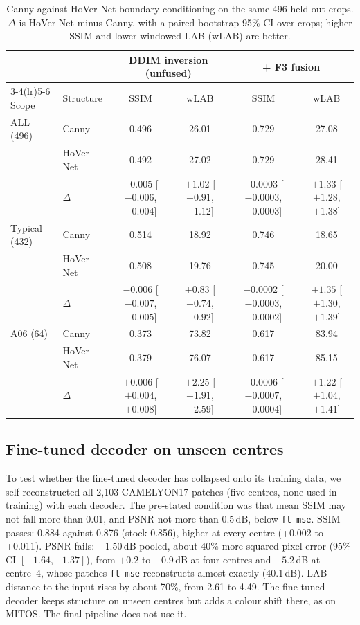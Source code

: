 \begin{table}[!tbp]
\centering
\caption{Canny against HoVer-Net boundary conditioning on the same 496 held-out crops. $\Delta$ is HoVer-Net
minus Canny, with a paired bootstrap 95\% CI over crops; higher SSIM and lower windowed LAB (wLAB) are better.}
\label{tab:app-hovernet}
\footnotesize
\begin{tabular}{llcccc}
\toprule
& & \multicolumn{2}{c}{DDIM inversion (unfused)} & \multicolumn{2}{c}{+ F3 fusion}\\
\cmidrule(lr){3-4}\cmidrule(lr){5-6}
Scope & Structure & SSIM & wLAB & SSIM & wLAB\\
\midrule
ALL (496) & Canny & 0.496 & 26.01 & 0.729 & 27.08\\
 & HoVer-Net & 0.492 & 27.02 & 0.729 & 28.41\\
 & $\Delta$ & $-0.005$ [$-0.006$, $-0.004$] & $+1.02$ [$+0.91$, $+1.12$] & $-0.0003$ [$-0.0003$, $-0.0003$] & $+1.33$ [$+1.28$, $+1.38$]\\
\midrule
Typical (432) & Canny & 0.514 & 18.92 & 0.746 & 18.65\\
 & HoVer-Net & 0.508 & 19.76 & 0.745 & 20.00\\
 & $\Delta$ & $-0.006$ [$-0.007$, $-0.005$] & $+0.83$ [$+0.74$, $+0.92$] & $-0.0002$ [$-0.0003$, $-0.0002$] & $+1.35$ [$+1.30$, $+1.39$]\\
\midrule
A06 (64) & Canny & 0.373 & 73.82 & 0.617 & 83.94\\
 & HoVer-Net & 0.379 & 76.07 & 0.617 & 85.15\\
 & $\Delta$ & $+0.006$ [$+0.004$, $+0.008$] & $+2.25$ [$+1.91$, $+2.59$] & $-0.0006$ [$-0.0007$, $-0.0004$] & $+1.22$ [$+1.04$, $+1.41$]\\
\bottomrule
\end{tabular}
\end{table}

\subsection{Fine-tuned decoder on unseen centres}
\label{app:decoder-cam}
To test whether the fine-tuned decoder has collapsed onto its training data, we self-reconstructed all 2{,}103
CAMELYON17 patches (five centres, none used in training) with each decoder. The pre-stated condition was that mean
SSIM may not fall more than 0.01, and PSNR not more than 0.5\,dB, below \texttt{ft-mse}. SSIM passes: 0.884 against
0.876 (stock 0.856), higher at every centre (+0.002 to +0.011). PSNR fails: $-1.50$\,dB pooled, about 40\% more squared pixel error (95\% CI $[-1.64,
-1.37]$), from $+0.2$ to $-0.9$\,dB at four centres and $-5.2$\,dB at centre~4, whose patches \texttt{ft-mse}
reconstructs almost exactly (40.1\,dB). LAB distance to the input rises by about 70\%, from 2.61 to 4.49. The fine-tuned decoder
keeps structure on unseen centres but adds a colour shift there, as on MITOS. The final pipeline does not use it.

